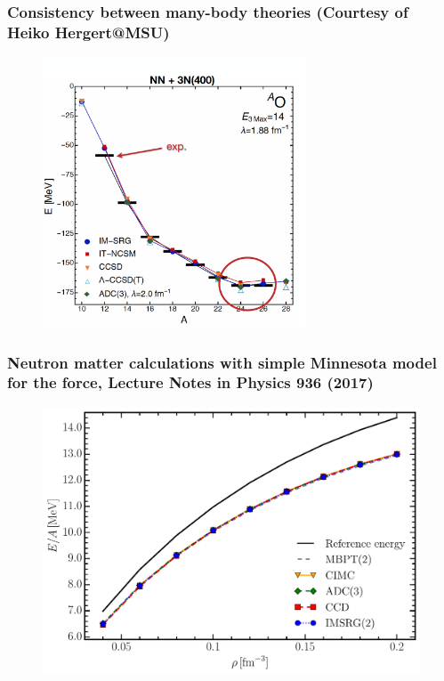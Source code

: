 \documentclass[compress]{beamer}
\begin{document}
\frame
{
  \frametitle{Consistency between many-body theories (Courtesy of Heiko Hergert@MSU)}
      \begin{figure}[htp]
        \centering	
        	\includegraphics[width=0.7\textwidth]{Figures/consistency.png}
      \end{figure}
}


\frame
{
  \frametitle{Neutron matter calculations with simple Minnesota model for the force, Lecture Notes in Physics {\bf 936} (2017)}
      \begin{figure}[htp]
        \centering	
        	\includegraphics[width=1.0\textwidth]{Figures/imsrg_pnm.pdf}
      \end{figure}
}
\end{document}
